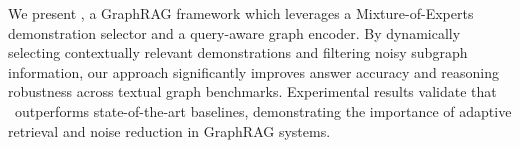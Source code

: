 

We present \myModel, a GraphRAG framework which leverages a Mixture-of-Experts demonstration selector and a query-aware graph encoder. By dynamically selecting contextually relevant demonstrations and filtering noisy subgraph information, our approach significantly improves answer accuracy and reasoning robustness across textual graph benchmarks. Experimental results validate that \myModel\ outperforms state-of-the-art baselines, demonstrating the importance of adaptive retrieval and noise reduction in GraphRAG systems.








